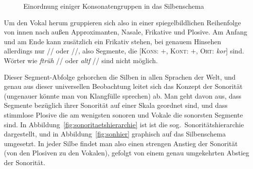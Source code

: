 \begin{figure}[!h]
  \centering
  \caption{Einordnung einiger Konsonatengruppen in das Silbenschema}
  \label{fig:silbenbau}
\end{figure}

Um den Vokal herum gruppieren sich also in einer spiegelbildlichen Reihenfolge von innen nach außen Approximanten, Nasale, Frikative und Plosive.
Am Anfang und am Ende kann zusätzlich ein Frikativ stehen, bei genauem Hinsehen allerdings nur // oder //, also Segmente, die [\textsc{Kons}: $+$, \textsc{Kont}: $+$, \textsc{Ort}: \textit{kor}] sind.
Wörter wie \textit{ftrüh} // oder \textit{altf} // sind nicht möglich.

Dieser Segment-Abfolge gehorchen die Silben in allen Sprachen der Welt, und genau aus dieser universellen Beobachtung leitet sich das Konzept der Sonorität (ungenauer könnte man von Klangfülle sprechen) ab.
Man geht davon aus, dass Segmente bezüglich ihrer Sonorität auf einer Skala geordnet sind, und dass stimmlose Plosive die am wenigsten sonoren und Vokale die sonorsten Segmente sind.
In Abbildung~\ref{fig:sonoritaetshierarchie} ist ist die sog.\ Sonoritätshierarchie dargestellt, und in Abbildung~\ref{fig:sonhier} graphisch auf das Silbenschema umgesetzt.
In jeder Silbe findet man also einen strengen Anstieg der Sonorität (von den Plosiven zu den Vokalen), gefolgt von einem genau umgekehrten Abstieg der Sonorität.

